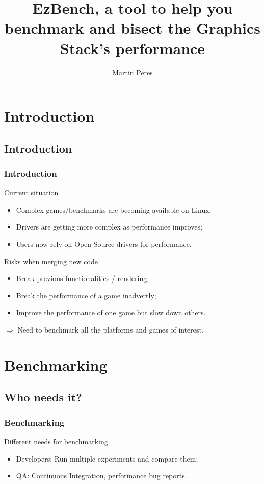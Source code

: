 \documentclass[11pt,english,compress]{beamer}
\title{EzBench, a tool to help you benchmark and bisect the Graphics Stack's performance}
\subtitle{}
\author{Martin Peres}
\institute{Intel Open Source Technology Center Finland}
\begin{document}

\begin{frame}
	\titlepage
\end{frame}

\section{Introduction}
\subsection*{Introduction}
\begin{frame}
	\frametitle{Introduction}

	\begin{block}{Current situation}
		\begin{itemize}
			\item Complex games/benchmarks are becoming available on Linux;
			\item Drivers are getting more complex as performance improves;
			\item Users now rely on Open Source drivers for performance.
		\end{itemize}
	\end{block}
	
	\pause
	
	\begin{block}{Risks when merging new code}
		\begin{itemize}
			\item Break previous functionalities / rendering;
			\item Break the performance of a game inadvertly;
			\item Improve the performance of one game but slow down others.
		\end{itemize}
	\end{block}
	
	\pause
	
	\begin{block}{}
		$\Rightarrow$ Need to benchmark all the platforms and games of interest.
	\end{block}
\end{frame}

\section{Benchmarking}
\subsection*{Who needs it?}
\begin{frame}
	\frametitle{Benchmarking}
	
	\begin{block}{Different needs for benchmarking}
		\begin{itemize}
			\item Developers: Run multiple experiments and compare them;
			\pause
			\item QA: Continuous Integration, performance bug reports.
		\end{itemize}
	\end{block}
\end{frame}
\end{document}
